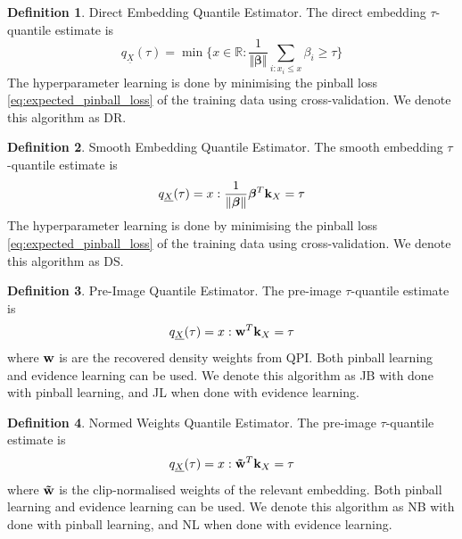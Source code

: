 \documentclass[twoside]{article} \usepackage{aistats2017}
\theoremstyle{definition}
\newtheorem{definition}{Definition}[section]
\theoremstyle{remark}
\newcommand{\rv}[1]{\underline{#1}}
\newcommand{\ds}[1]{{#1}}
\begin{document}
	\theoremstyle{definition}
	\begin{definition}{Direct Embedding Quantile Estimator.}
		The direct embedding $\tau$-quantile estimate is
		\begin{equation}
			q_{\rv{X}}(\tau) = \min\{x \in \mathbb{R} : \frac{1}{\Vert \bm{\beta} \Vert} \sum_{i : x_{i} \leq x} \beta_{i} \geq \tau\}
		\end{equation}	
		The hyperparameter learning is done by minimising the pinball loss \eqref{eq:expected_pinball_loss} of the training data using cross-validation. We denote this algorithm as DR.
	\end{definition}
	
	\theoremstyle{definition}
	\begin{definition}{Smooth Embedding Quantile Estimator.}
		The smooth embedding $\tau$-quantile estimate is
		\begin{equation}
			q_{\rv{X}}(\tau) = x : \frac{1}{\Vert \bm{\beta} \Vert} \bm{\beta}^{T} \bvec{k}_{\ds{X}} = \tau
		\end{equation}	
		The hyperparameter learning is done by minimising the pinball loss \eqref{eq:expected_pinball_loss} of the training data using cross-validation. We denote this algorithm as DS.
	\end{definition}
	
	\theoremstyle{definition}
	\begin{definition}{Pre-Image Quantile Estimator.}
		The pre-image $\tau$-quantile estimate is
		\begin{equation}
			q_{\rv{X}}(\tau) = x : \bvec{w}^{T} \bvec{k}_{\ds{X}} = \tau
		\end{equation}	
		where $\mathbf{w}$ is are the recovered density weights from QPI.
		Both pinball learning and evidence learning can be used. We denote this algorithm as JB with done with pinball learning, and JL when done with evidence learning.
	\end{definition}
	
	\theoremstyle{definition}
	\begin{definition}{Normed Weights Quantile Estimator.}
		The pre-image $\tau$-quantile estimate is
		\begin{equation}
		q_{\rv{X}}(\tau) = x : \bvec{\tilde{w}}^{T} \bvec{k}_{\ds{X}} = \tau
		\end{equation}
		where $\mathbf{\tilde{w}}$ is the clip-normalised weights of the relevant embedding.
		Both pinball learning and evidence learning can be used. We denote this algorithm as NB with done with pinball learning, and NL when done with evidence learning.
	\end{definition}	
	
\end{document}
